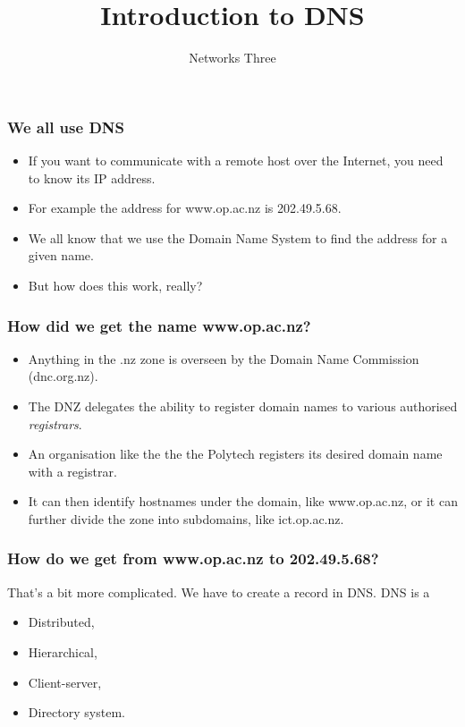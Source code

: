 \documentclass[10pt]{beamer}
\title{Introduction to DNS}
\author[IN715]{Networks Three}
\institute[Otago Polytechnic]{
  Otago Polytechnic \\
  Dunedin, New Zealand \\
}
\date{}
\begin{document}
\begin{frame}[plain]
  \titlepage
\end{frame}


\begin{frame}
  \frametitle{We all use DNS}

 \begin{itemize}
  \item If you want to communicate with a remote host over the Internet, 
        you need to know its IP address.
  \item For example the address for www.op.ac.nz is 202.49.5.68.
  \item We all know that we use the Domain Name System to find the 
        address for a given name.
  \item But how does this work, really? 
 \end{itemize}

\end{frame}


\begin{frame}
  \frametitle{How did we get the name www.op.ac.nz?}

 \begin{itemize}
  \item Anything in the .nz zone is overseen by the Domain Name Commission (dnc.org.nz).
  \item The DNZ delegates the ability to register domain names to various authorised \emph{registrars}.
  \item An organisation like the the the Polytech registers its desired domain name with a registrar.
  \item It can then identify hostnames under the domain, like www.op.ac.nz, or it can further divide the zone into subdomains, like ict.op.ac.nz.
 \end{itemize}

\end{frame}

\begin{frame}
  \frametitle{How do we get from www.op.ac.nz to 202.49.5.68?}

 That's a bit more complicated.  We have to create a record in DNS.  DNS is a
 \begin{itemize}
  \item Distributed,
  \item Hierarchical,
  \item Client-server,
  \item Directory system.
 \end{itemize}

\end{frame}
\end{document}
